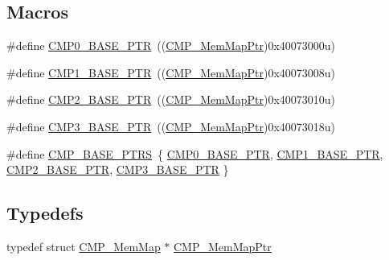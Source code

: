\subsection*{Macros}
\begin{DoxyCompactItemize}
\item 
\#define \hyperlink{group___c_m_p___peripheral_ga5a7a6b1d0743a05435ba5cb2dc2b3431}{C\+M\+P0\+\_\+\+B\+A\+S\+E\+\_\+\+P\+T\+R}~((\hyperlink{group___c_m_p___peripheral_ga6f5d370df3839e41b771c2d0b89cbb83}{C\+M\+P\+\_\+\+Mem\+Map\+Ptr})0x40073000u)
\item 
\#define \hyperlink{group___c_m_p___peripheral_ga91e89d9d49a3f251dcd9026ad403a3e8}{C\+M\+P1\+\_\+\+B\+A\+S\+E\+\_\+\+P\+T\+R}~((\hyperlink{group___c_m_p___peripheral_ga6f5d370df3839e41b771c2d0b89cbb83}{C\+M\+P\+\_\+\+Mem\+Map\+Ptr})0x40073008u)
\item 
\#define \hyperlink{group___c_m_p___peripheral_ga732cbf43f95d2d1cd01b4204263940ab}{C\+M\+P2\+\_\+\+B\+A\+S\+E\+\_\+\+P\+T\+R}~((\hyperlink{group___c_m_p___peripheral_ga6f5d370df3839e41b771c2d0b89cbb83}{C\+M\+P\+\_\+\+Mem\+Map\+Ptr})0x40073010u)
\item 
\#define \hyperlink{group___c_m_p___peripheral_ga793306a1014f5112aa61f346fe3bb2c0}{C\+M\+P3\+\_\+\+B\+A\+S\+E\+\_\+\+P\+T\+R}~((\hyperlink{group___c_m_p___peripheral_ga6f5d370df3839e41b771c2d0b89cbb83}{C\+M\+P\+\_\+\+Mem\+Map\+Ptr})0x40073018u)
\item 
\#define \hyperlink{group___c_m_p___peripheral_gacc69654296499d45b2060956a3c8e97f}{C\+M\+P\+\_\+\+B\+A\+S\+E\+\_\+\+P\+T\+R\+S}~\{ \hyperlink{group___c_m_p___peripheral_ga5a7a6b1d0743a05435ba5cb2dc2b3431}{C\+M\+P0\+\_\+\+B\+A\+S\+E\+\_\+\+P\+T\+R}, \hyperlink{group___c_m_p___peripheral_ga91e89d9d49a3f251dcd9026ad403a3e8}{C\+M\+P1\+\_\+\+B\+A\+S\+E\+\_\+\+P\+T\+R}, \hyperlink{group___c_m_p___peripheral_ga732cbf43f95d2d1cd01b4204263940ab}{C\+M\+P2\+\_\+\+B\+A\+S\+E\+\_\+\+P\+T\+R}, \hyperlink{group___c_m_p___peripheral_ga793306a1014f5112aa61f346fe3bb2c0}{C\+M\+P3\+\_\+\+B\+A\+S\+E\+\_\+\+P\+T\+R} \}
\end{DoxyCompactItemize}
\subsection*{Typedefs}
\begin{DoxyCompactItemize}
\item 
typedef struct \hyperlink{struct_c_m_p___mem_map}{C\+M\+P\+\_\+\+Mem\+Map} $\ast$ \hyperlink{group___c_m_p___peripheral_ga6f5d370df3839e41b771c2d0b89cbb83}{C\+M\+P\+\_\+\+Mem\+Map\+Ptr}
\end{DoxyCompactItemize}


